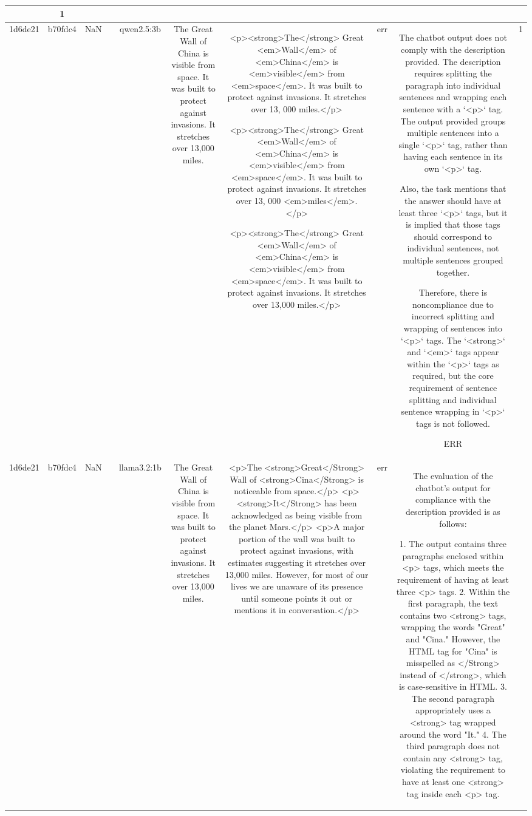 \begin{table}[h!]
\begin{tabular}{|c|c|c|c|c|c|c|c|c|c|}
{{ERR & 1\\
\hline
1d6de21 & b70fdc4 & NaN &  & qwen2.5:3b & The Great Wall of China is visible from space. It was built to protect against invasions. It stretches over 13,000 miles. & <p><strong>The</strong> Great <em>Wall</em> of <em>China</em> is <em>visible</em> from <em>space</em>. It was built to protect against invasions. It stretches over 13, 000 miles.</p>

<p><strong>The</strong> Great <em>Wall</em> of <em>China</em> is <em>visible</em> from <em>space</em>. It was built to protect against invasions. It stretches over 13, 000 <em>miles</em>.</p>

<p><strong>The</strong> Great <em>Wall</em> of <em>China</em> is <em>visible</em> from <em>space</em>. It was built to protect against invasions. It stretches over 13,000 miles.</p> & err & The chatbot output does not comply with the description provided. The description requires splitting the paragraph into individual sentences and wrapping each sentence with a `<p>` tag. The output provided groups multiple sentences into a single `<p>` tag, rather than having each sentence in its own `<p>` tag.

Also, the task mentions that the answer should have at least three `<p>` tags, but it is implied that those tags should correspond to individual sentences, not multiple sentences grouped together.

Therefore, there is noncompliance due to incorrect splitting and wrapping of sentences into `<p>` tags. The `<strong>` and `<em>` tags appear within the `<p>` tags as required, but the core requirement of sentence splitting and individual sentence wrapping in `<p>` tags is not followed. 

ERR & 1\\
\hline
1d6de21 & b70fdc4 & NaN &  & llama3.2:1b & The Great Wall of China is visible from space. It was built to protect against invasions. It stretches over 13,000 miles. & <p>The <strong>Great</Strong> Wall of <strong>Cina</Strong> is noticeable from space.</p>
<p><strong>It</Strong> has been acknowledged as being visible from the planet Mars.</p>
<p>A major portion of the wall was built to protect against invasions, with estimates suggesting it stretches over 13,000 miles. However, for most of our lives we are unaware of its presence until someone points it out or mentions it in conversation.</p> & err & The evaluation of the chatbot's output for compliance with the description provided is as follows:

1. The output contains three paragraphs enclosed within <p> tags, which meets the requirement of having at least three <p> tags.
2. Within the first paragraph, the text contains two <strong> tags, wrapping the words "Great" and "Cina." However, the HTML tag for "Cina" is misspelled as </Strong> instead of </strong>, which is case-sensitive in HTML.
3. The second paragraph appropriately uses a <strong> tag wrapped around the word "It."
4. The third paragraph does not contain any <strong> tag, violating the requirement to have at least one <strong> tag inside each <p> tag.

}}
\end{tabular}
\end{table}
